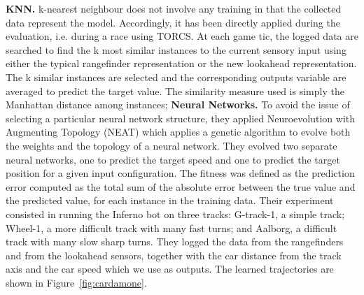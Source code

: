 \textbf{KNN.} k-nearest neighbour does not involve any training in that the collected data represent the model. Accordingly, it has been directly applied during the evaluation, i.e. during a race using TORCS. At each game tic, the logged data are searched to find the k most similar instances to the current sensory input using either the typical rangefinder representation or the new lookahead representation. The k similar instances are selected and the corresponding outputs variable are averaged to predict the target value. The similarity measure used is simply the Manhattan distance among instances;
\textbf{Neural Networks.} To avoid the issue of selecting a particular neural network structure, they applied Neuroevolution with Augmenting Topology (NEAT) \cite{neat} which applies a genetic algorithm to evolve both the weights and the topology of a neural network. They evolved two separate neural networks, one to predict the target speed and one to predict the target position for a given input configuration. The fitness was defined as the prediction error computed as the total sum of the absolute error between the true value and the predicted value, for each instance in the training data. 
Their experiment consisted in running the Inferno bot on three tracks: G-track-1, a simple track; Wheel-1, a more difficult track with many fast turns; and Aalborg, a difficult track with many slow sharp turns. They logged the data from the rangefinders and from the lookahead sensors, together with the car distance from the track axis and the car speed which we use
as outputs.
The learned trajectories are shown in Figure~\ref{fig:cardamone}.




